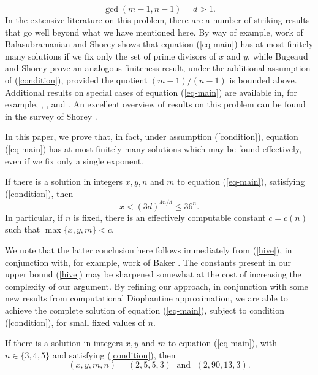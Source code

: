  \begin{equation} \label{condition}
 \gcd (m-1,n-1) = d > 1.
 \end{equation}
 In the extensive literature on this problem, there are a number of striking results that go well beyond what we have mentioned here. By way of example, work of Balasubramanian and 
 Shorey \cite{BaSh} shows that equation (\ref{eq-main}) has at most finitely many solutions if we fix only the set of prime divisors of $x$ and $y$, while Bugeaud and Shorey \cite{BuSh} prove an analogous finiteness result, under the additional assumption of (\ref{condition}), provided the quotient $(m-1)/(n-1)$ is bounded above. Additional results on special cases of equation (\ref{eq-main}) are available in, for example, \cite{HeTo}, \cite{Le1}, \cite{Le2} and \cite{Le3}.  An excellent overview of results on this problem  can be found in the survey of Shorey \cite{ShoSur}.
 
In this paper, we prove that, in fact, under assumption (\ref{condition}), equation (\ref{eq-main}) has at most finitely many solutions which may be found effectively, even if we fix only a single exponent.
\begin{theorem} \label{main-thm}
If there is a solution in integers $x,y, n$ and $m$ to equation (\ref{eq-main}), satisfying (\ref{condition}), then
\begin{equation} \label{hive}
x <  (3d)^{4n/d} \leq  36^n.
\end{equation}
In particular, if $n$ is fixed, there is an effectively computable constant $c=c(n)$ such that
$\max \{ x, y, m \} < c$.
\end{theorem}
We note that the latter conclusion here follows immediately from (\ref{hive}), in conjunction with, for example, work of Baker \cite{Bak}.
The constants present in our upper bound (\ref{hive}) may be sharpened somewhat at the cost of increasing the complexity of our argument. By refining our approach, in conjunction with some new results from computational Diophantine approximation, we are able to achieve the complete solution of equation (\ref{eq-main}), subject to condition (\ref{condition}),  for small fixed values of $n$.

\begin{theorem} \label{main-thm2}
If there is a solution in integers $x,y$ and $m$ to equation (\ref{eq-main}), with $n \in \{ 3, 4, 5 \}$ and satisfying (\ref{condition}), then
$$
(x,y,m,n) = (2,5,5,3)  \; \mbox{ and } \; (2,90,13,3).
$$
\end{theorem}

